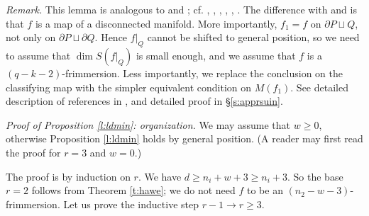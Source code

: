\documentclass[12pt]{article}
\theoremstyle{plain}
\theoremstyle{definition}
\begin{document}
{\it Remark.} This lemma is analogous to \cite[Theorem 4.5 and appendix A]{HK98} and \cite[Theorem 4.7 and appendix]{CRS}; cf. \cite{Ha63}, \cite[Lemma 4.2]{Ha84},
\cite[The Surgery of Intersection Lemma 2.1]{AMSW}, \cite[\S4.1]{MW16}, \cite[proof of Theorem 1.1 in p. 7]{Me17}, \cite{Me18}.
The difference with \cite[Theorem 4.5]{HK98} and \cite[Theorem 4.7]{CRS} is that $f$ is a map of a disconnected manifold.
More importantly, $f_1=f$ on $\partial P\sqcup Q$, not only on $\partial P\sqcup \partial Q$.
Hence $f|_Q$ cannot be shifted to general position, so we need to assume that $\dim S(f|_Q)$ is small enough, and we assume that $f$ is a $(q-k-2)$-frimmersion.
Less importantly, we replace the conclusion on the classifying map with the simpler equivalent condition on $M(f_1)$.
See detailed description of references in \cite[Remark 2.3.a]{AMSW}, and detailed proof in \S\ref{s:apprsuin}.



\smallskip
{\it Proof of Proposition \ref{l:ldmin}: organization.}
We may assume that $w\ge0$, otherwise Proposition \ref{l:ldmin} holds by general position.
(A reader may first read the proof for $r=3$ and $w=0$.)

The proof is by induction on $r$.
We have $d\ge n_i+w+3\ge n_i+3$.
So the base $r=2$ follows from Theorem \ref{t:hawe};
we do not need $f$ to be an $(n_2-w-3)$-frimmersion.
Let us prove the inductive step $r-1\to r\ge3$.
\end{document}
